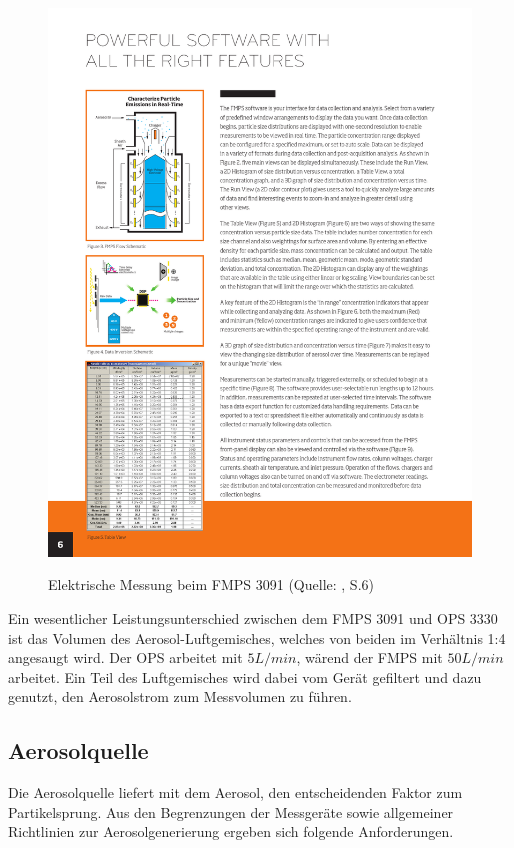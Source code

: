 \begin{figure}[H]
	\myfloatalign
	{\includegraphics[width=.9\linewidth]{gfx/requirements/fmps_3091.pdf}} \quad
	\caption[Elektrische Messung beim FMPS 3091 (Quelle: \cite{fmps_3091}, S.6)]
	{Elektrische Messung beim FMPS 3091 (Quelle: \cite{fmps_3091}, S.6)}
	\label{fig:elektrisch_messer}
\end{figure}

Ein wesentlicher Leistungsunterschied zwischen dem FMPS 3091 und OPS 3330 ist das Volumen des Aerosol-Luftgemisches, welches von beiden im Verh\"{a}ltnis 1:4 angesaugt wird. Der OPS arbeitet mit $5 L/min$, w\"{a}rend der FMPS mit $50 L/min$ arbeitet. Ein Teil des Luftgemisches wird dabei vom Ger\"{a}t gefiltert und dazu genutzt, den Aerosolstrom zum Messvolumen zu f\"{u}hren.   

\subsection{Aerosolquelle}
Die Aerosolquelle liefert mit dem Aerosol, den entscheidenden Faktor zum Partikelsprung. Aus den Begrenzungen der Messger\"{a}te sowie allgemeiner Richtlinien zur Aerosolgenerierung ergeben sich folgende Anforderungen.

